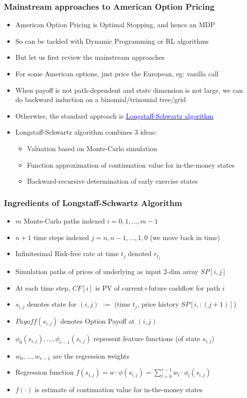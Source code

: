\documentclass[handout]{beamer}
\begin{document}
\begin{frame}
\frametitle{Mainstream approaches to American Option Pricing}
\pause
\begin{itemize}[<+->]
\item American Option Pricing is Optimal Stopping, and hence an MDP
\item So can be tackled with Dynamic Programming or RL algorithms
\item But let us first review the mainstream approaches
\item For some American options, just price the European, eg: vanilla call
\item When payoff is not path-dependent and state dimension is not large, we can do backward induction on a binomial/trinomial tree/grid
\item Otherwise, the standard approach is \href{https://people.math.ethz.ch/~hjfurrer/teaching/LongstaffSchwartzAmericanOptionsLeastSquareMonteCarlo.pdf}{\underline{\textcolor{blue}{Longstaff-Schwartz algorithm}}}
\item Longstaff-Schwartz algorithm combines 3 ideas:
\begin{itemize}
\item Valuation based on Monte-Carlo simulation
\item Function approximation of continuation value for in-the-money states
\item Backward-recursive determination of early exercise states
\end{itemize}
\end{itemize}
\end{frame}

\begin{frame}
\frametitle{Ingredients of Longstaff-Schwartz Algorithm}
\pause
\begin{itemize}[<+->]
\item $m$ Monte-Carlo paths indexed $i = 0, 1, \ldots, m-1$
\item $n+1$ time steps indexed $j = n, n-1, \ldots, 1, 0$ (we move back in time)
\item Infinitesimal Risk-free rate at time $t_j$ denoted $r_{t_j}$
\item Simulation paths of prices of underlying as input 2-dim array $SP[i,j]$
\item At each time step, $CF[i]$ is PV of current+future cashflow for path $i$
\item $s_{i,j}$ denotes state for $(i,j)$ $:=$ (time $t_j$, price history $SP[i,:(j+1)]$)
\item $Payoff(s_{i,j})$ denotes Option Payoff at $(i,j)$
\item $\phi_0(s_{i,j}), \ldots, \phi_{r-1}(s_{i,j})$ represent feature functions (of state $s_{i,j}$)
\item $w_0, \ldots, w_{r-1}$ are the regression weights
\item Regression function $f(s_{i,j}) = w \cdot \phi(s_{i,j}) = \sum_{l=0}^{r-1} w_l \cdot \phi_l(s_{i,j})$
\item $f(\cdot)$ is estimate of continuation value for in-the-money states
\end{itemize}
\end{frame}
\end{document}
